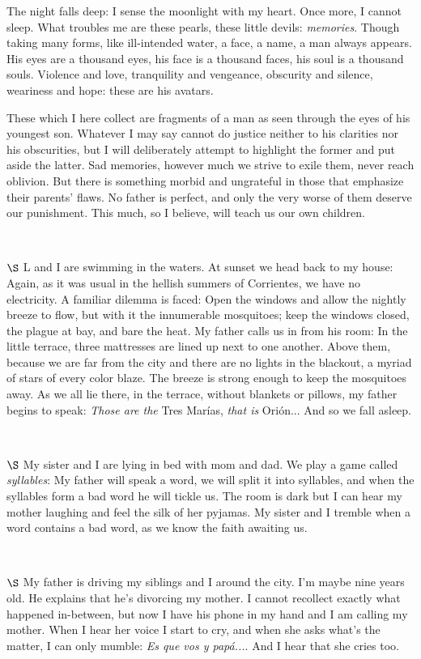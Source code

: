 \documentclass[a4paper, 12pt]{article}
\begin{document}
The night falls deep: I sense the moonlight with my heart. Once more, I cannot
sleep. What troubles me are these pearls, these little devils:
\textit{memories}. Though taking many forms, like ill-intended water, a face, a
name, a man always appears. His eyes are a thousand eyes, his face is a
thousand faces, his soul is a thousand souls. Violence and love, tranquility
and vengeance, obscurity and silence, weariness and hope: these are his
avatars. 

These which I here collect are fragments of a man as seen through the eyes of
his youngest son. Whatever I may say cannot do justice neither to his clarities
nor his obscurities, but I will deliberately attempt to highlight the former and
put aside the latter. Sad memories, however much we strive to exile them,
never reach oblivion. But there is something morbid and ungrateful in those 
that emphasize their parents' flaws. No father is perfect, and only the very
worse of them deserve our punishment. This much, so I believe, will teach us
our own children.


~ 

$\S$ L and I are swimming in the waters. At sunset we head back to my house: Again, as it was usual in the
hellish summers of Corrientes, we have no electricity. A familiar dilemma is
faced: Open the windows and allow the nightly breeze to flow, but with it the
innumerable mosquitoes; keep the windows closed, the plague at bay,
and bare the heat. My father calls us in from his room: In the little terrace,
three mattresses are lined up next to one another. Above them, because we are 
far from the city and there are no lights in the blackout, a myriad of stars of every
color blaze. The breeze is strong enough to keep the mosquitoes 
away. As we all lie there, in the terrace, without blankets or pillows,
my father begins to speak: \textit{Those are the} Tres Marías, \textit{that is } Orión...
And so we fall asleep.

~ 


$\S$ My sister and I are lying in bed with mom and dad. We play a game called
\textit{syllables}: My father will speak a word, we will split it into
syllables, and when the syllables form a bad word he will tickle us. The room
is dark but I can hear my mother laughing and feel the silk of her pyjamas. My
sister and I tremble when a word contains a bad word, as we know the faith
awaiting us.

~ 

$\S$ My father is driving my siblings and I around the city. I'm maybe nine
years old. He explains that he's divorcing my mother. I cannot recollect
exactly what happened in-between, but now I have his phone in my hand and I am
calling my mother. When I hear her voice I start to cry, and when she asks
what's the matter, I can only mumble: \textit{Es que vos y papá...}. And I hear
that she cries too.
\end{document}

